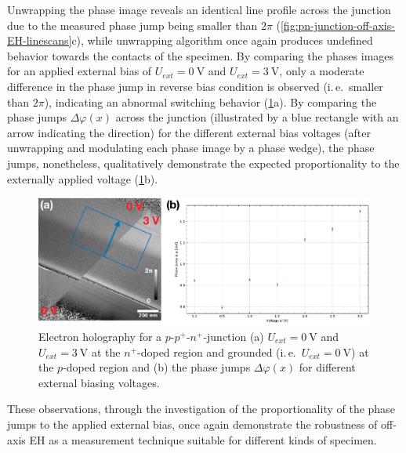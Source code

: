 Unwrapping the phase image reveals an identical line profile across the junction due to the measured phase jump being smaller than $2\pi$ (\cref{fig:pn-junction-off-axis-EH-linescans}c), while unwrapping algorithm once again produces undefined behavior towards the contacts of the specimen.
\newpage
By comparing the phases images for an applied external bias of $U_{\mathit{ext}} = \SI{0}{\volt}$ and $U_{\mathit{ext}} = \SI{3}{\volt}$, only a moderate difference in the phase jump in reverse bias condition is observed (i.\,e.\ smaller than $2\pi$), indicating an abnormal switching behavior (\cref{fig:pn-junction-off-axis-EH-phase-jump}a). By comparing the phase jumps $\Delta \varphi\left(x\right)$ across the junction (illustrated by a blue rectangle with an arrow indicating the direction) for the different external bias voltages (after unwrapping and modulating each phase image by a phase wedge), the phase jumps, nonetheless, qualitatively demonstrate the expected proportionality to the externally applied voltage (\cref{fig:pn-junction-off-axis-EH-phase-jump}b).
\begin{figure}[H]
	\centering
	\includegraphics[width=\textwidth]{Figures/Results/pn-Junction/Holography/pn-junction-off-axis-EH-phase-jump.pdf}
	\caption{Electron holography for a $p$-$p^+$-$n^+$-junction (a) $U_{\mathit{ext}} = \SI{0}{\volt}$ and $U_{\mathit{ext}} = \SI{3}{\volt}$ at the $n^+$-doped region and grounded (i.\,e.\ $U_{\mathit{ext}} = \SI{0}{\volt}$) at the $p$-doped region and (b) the phase jumps $\Delta \varphi\left(x\right)$ for different external biasing voltages.}
	\label{fig:pn-junction-off-axis-EH-phase-jump}
\end{figure}
These observations, through the investigation of the proportionality of the phase jumps to the applied external bias, once again demonstrate the robustness of off-axis EH as a measurement technique suitable for different kinds of specimen.
\newpage
